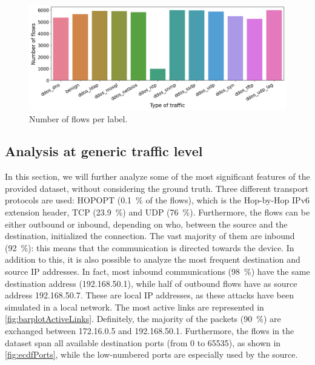 \documentclass[acmlarge,nonacm]{acmart}
\begin{document}
\begin{figure}
	\centering
		\includegraphics[width=0.8\linewidth]{img/barplot_labels.png}
		 \caption{Number of flows per label.}\label{fig:barplotLabels}
\end{figure}

\subsection{Analysis at generic traffic level}\label{sec:featureVisualization}
In this section, we will further analyze some of the most significant features of the provided dataset, without considering the ground truth. Three different transport protocols are used: HOPOPT (\SI{0.1}{\percent} of the flows), which is the Hop-by-Hop IPv6 extension header, TCP (\SI{23.9}{\percent}) and UDP (\SI{76}{\percent}). Furthermore, the flows can be either outbound or inbound, depending on who, between the source and the destination, initialized the connection. The vast majority of them are inbound (\SI{92}{\percent}): this means that the communication is directed towards the device. In addition to this, it is also possible to analyze the most frequent destination and source IP addresses. In fact, most inbound communications (\SI{98}{\percent}) have the same destination address (192.168.50.1), while half of outbound flows have as source address 192.168.50.7. These are local IP addresses, as these attacks have been simulated in a local network. The most active links are represented in \cref{fig:barplotActiveLinks}. Definitely, the majority of the packets (\SI{90}{\percent}) are exchanged between 172.16.0.5 and 192.168.50.1. Furthermore, the flows in the dataset span all available destination ports (from 0 to \num{65535}), as shown in \cref{fig:ecdfPorts}, while the low-numbered ports are especially used by the source. 
\end{document}
